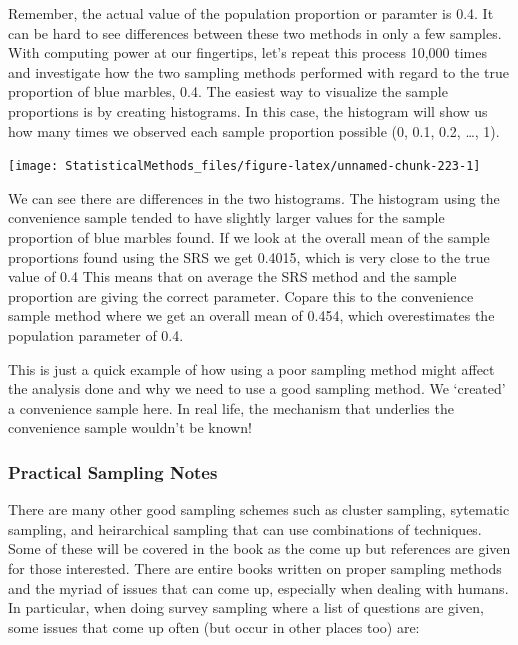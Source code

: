 \documentclass[
]{book}
\theoremstyle{definition}
\theoremstyle{definition}
\theoremstyle{definition}
\theoremstyle{remark}
\begin{document}
Remember, the actual value of the population proportion or paramter is 0.4. It can be hard to see differences between these two methods in only a few samples. With computing power at our fingertips, let's repeat this process 10,000 times and investigate how the two sampling methods performed with regard to the true proportion of blue marbles, 0.4. The easiest way to visualize the sample proportions is by creating histograms. In this case, the histogram will show us how many times we observed each sample proportion possible (0, 0.1, 0.2, \ldots{}, 1).

\begin{center}\texttt{[image: StatisticalMethods\_files/figure-latex/unnamed-chunk-223-1]} \end{center}

We can see there are differences in the two histograms. The histogram using the convenience sample tended to have slightly larger values for the sample proportion of blue marbles found. If we look at the overall mean of the sample proportions found using the SRS we get 0.4015, which is very close to the true value of 0.4 This means that on average the SRS method and the sample proportion are giving the correct parameter. Copare this to the convenience sample method where we get an overall mean of 0.454, which overestimates the population parameter of 0.4.

This is just a quick example of how using a poor sampling method might affect the analysis done and why we need to use a good sampling method. We `created' a convenience sample here. In real life, the mechanism that underlies the convenience sample wouldn't be known!

\hypertarget{practical-sampling-notes}{%
\subsubsection{Practical Sampling Notes}\label{practical-sampling-notes}}

There are many other good sampling schemes such as cluster sampling, sytematic sampling, and heirarchical sampling that can use combinations of techniques. Some of these will be covered in the book as the come up but references are given for those interested. There are entire books written on proper sampling methods and the myriad of issues that can come up, especially when dealing with humans. In particular, when doing survey sampling where a list of questions are given, some issues that come up often (but occur in other places too) are:
\end{document}
